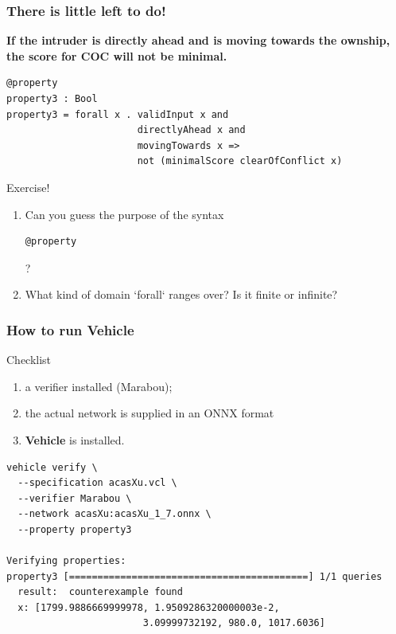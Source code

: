 \documentclass[t,compress,aspectratio=169]{beamer}
\begin{document}
\begin{frame}[fragile]
\frametitle{There is little left to do!}

\footnotesize{
\textbf{If the intruder is directly ahead and is moving towards the
 ownship, the score for COC will not be minimal.}}

\pause

\begin{verbatim}
@property
property3 : Bool
property3 = forall x . validInput x and 
                       directlyAhead x and 
                       movingTowards x =>
                       not (minimalScore clearOfConflict x)
\end{verbatim}
\pause
\begin{block}{Exercise!}
\footnotesize{
\begin{enumerate}
\item Can you guess the purpose of the syntax
\begin{verbatim}
@property
\end{verbatim}
?
\item What kind of domain  `forall` ranges over? Is it finite or infinite?
\end{enumerate}}
\end{block}

\end{frame}



\begin{frame}[fragile]
\frametitle{How to run Vehicle}
\vspace{-2em}
\begin{block}{Checklist}
\begin{enumerate}
\item a verifier installed (Marabou);
\item the actual network is supplied in an ONNX format
\item \textbf{Vehicle} is installed.
\end{enumerate}
\end{block}

\pause
\begin{verbatim}
vehicle verify \
  --specification acasXu.vcl \
  --verifier Marabou \
  --network acasXu:acasXu_1_7.onnx \
  --property property3

Verifying properties:
property3 [==========================================] 1/1 queries
  result:  counterexample found
  x: [1799.9886669999978, 1.9509286320000003e-2, 
                        3.09999732192, 980.0, 1017.6036]
\end{verbatim}
\end{frame}
\end{document}

